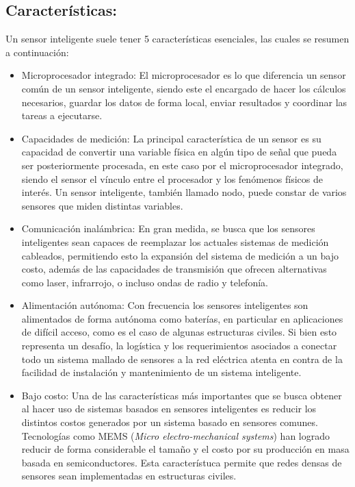 
\subsection{Características:}

Un sensor inteligente suele tener 5 características esenciales, las cuales se resumen a continuación:

\begin{itemize}
    \item Microprocesador integrado: El microprocesador es lo que diferencia un sensor común de un sensor inteligente, siendo este el encargado de hacer los cálculos necesarios, guardar los datos de forma local, enviar resultados y coordinar las tareas a ejecutarse. 
    
    \item Capacidades de medición: La principal característica de un sensor es su capacidad de convertir una variable física en algún tipo de señal que pueda ser posteriormente procesada, en este caso por el microprocesador integrado, siendo el sensor el vínculo entre el procesador y los fenómenos físicos de interés. Un sensor inteligente, también llamado nodo, puede constar de varios sensores que miden distintas variables.
    
    \item Comunicación inalámbrica: En gran medida, se busca que los sensores inteligentes sean capaces de reemplazar los actuales sistemas de medición cableados, permitiendo esto la expansión del sistema de medición a un bajo costo, además de las capacidades de transmisión que ofrecen alternativas como laser, infrarrojo, o incluso ondas de radio y telefonía.
    
    \item Alimentación autónoma: Con frecuencia los sensores inteligentes son alimentados de forma autónoma como baterías, en particular en aplicaciones de difícil acceso, como es el caso de algunas estructuras civiles. Si bien esto representa un desafío, la logística y los requerimientos asociados a conectar todo un sistema mallado de sensores a la red eléctrica atenta en contra de la facilidad de instalación y mantenimiento de un sistema inteligente.
    
    \item Bajo costo: Una de las características más importantes que se busca obtener al hacer uso de sistemas basados en sensores inteligentes es reducir los distintos costos generados por un sistema basado en sensores comunes. Tecnologías como MEMS (\textit{Micro electro-mechanical systems}) han logrado reducir de forma considerable el tamaño y el costo por su producción en masa basada en semiconductores. Esta característuca permite que redes densas de sensores sean implementadas en estructuras civiles.
\end{itemize}


